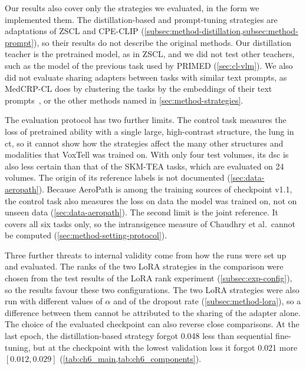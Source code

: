 Our results also cover only the strategies we evaluated, in the form we implemented them.
The distillation-based and prompt-tuning strategies are adaptations of ZSCL and CPE-CLIP (\cref{subsec:method-distillation,subsec:method-prompt}), so their results do not describe the original methods.
Our distillation teacher is the pretrained model, as in ZSCL, and we did not test other teachers, such as the model of the previous task used by PRIMED (\cref{sec:cl-vlm}).
We also did not evaluate sharing adapters between tasks with similar text prompts, as MedCRP-CL does by clustering the tasks by the embeddings of their text prompts~\cite{gao2026medcrpcl}, or the other methods named in \cref{sec:method-strategies}.

The evaluation protocol has two further limits.
The control task measures the loss of pretrained ability with a single large, high-contrast structure, the lung in \gls{ct}, so it cannot show how the strategies affect the many other structures and modalities that VoxTell was trained on.
With only four test volumes, its \gls{dsc} is also less certain than that of the SKM-TEA tasks, which are evaluated on 24 volumes.
The origin of its reference labels is not documented (\cref{sec:data-aeropath}).
Because AeroPath is among the training sources of checkpoint v1.1, the control task also measures the loss on data the model was trained on, not on unseen data (\cref{sec:data-aeropath}).
The second limit is the joint reference.
It covers all six tasks only, so the intransigence measure of Chaudhry et al.\ cannot be computed (\cref{sec:method-setting-protocol}).

Three further threats to internal validity come from how the runs were set up and evaluated.
The ranks of the two LoRA strategies in the comparison were chosen from the test results of the LoRA rank experiment (\cref{subsec:exp-config}), so the results favour these two configurations.
The two LoRA strategies were also run with different values of $\alpha$ and of the dropout rate (\cref{subsec:method-lora}), so a difference between them cannot be attributed to the sharing of the adapter alone.
The choice of the evaluated checkpoint can also reverse close comparisons.
At the last epoch, the distillation-based strategy forgot 0.048 less than sequential fine-tuning, but at the checkpoint with the lowest validation loss it forgot 0.021 more $[0.012, 0.029]$ (\cref{tab:ch6_main,tab:ch6_components}).

